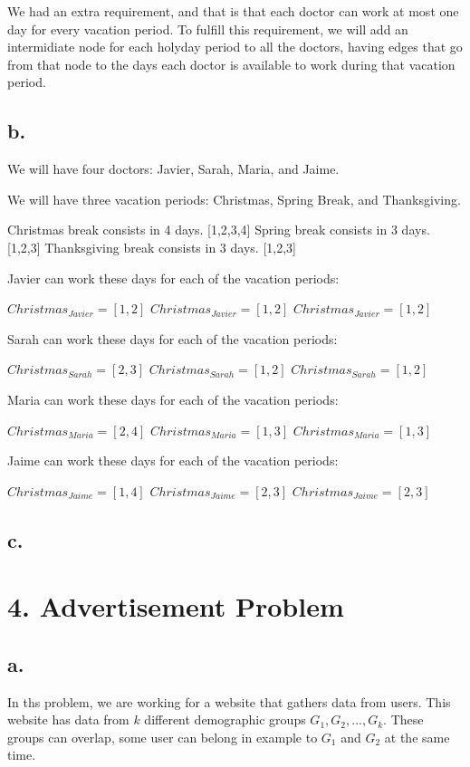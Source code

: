 \documentclass{article}
\begin{document}
We had an extra requirement, and that is that each doctor can work at most one day for every vacation period. To fulfill this requirement, we will add an intermidiate node for each holyday period to all the doctors, having edges that go from that node to the days each doctor is available to work during that vacation period.

\subsection*{b.}

We will have four doctors: Javier, Sarah, Maria, and Jaime.

We will have three vacation periods: Christmas, Spring Break, and Thanksgiving.

Christmas break consists in 4 days. [1,2,3,4]
Spring break consists in 3 days. [1,2,3]
Thanksgiving break consists in 3 days. [1,2,3]

Javier can work these days for each of the vacation periods:

$Christmas_{Javier} = [1,2]$
$Christmas_{Javier} = [1,2]$
$Christmas_{Javier} = [1,2]$

Sarah can work these days for each of the vacation periods:

$Christmas_{Sarah} = [2,3]$
$Christmas_{Sarah} = [1,2]$
$Christmas_{Sarah} = [1,2]$

Maria can work these days for each of the vacation periods:

$Christmas_{Maria} = [2,4]$
$Christmas_{Maria} = [1,3]$
$Christmas_{Maria} = [1,3]$

Jaime can work these days for each of the vacation periods:

$Christmas_{Jaime} = [1,4]$
$Christmas_{Jaime} = [2,3]$
$Christmas_{Jaime} = [2,3]$


\subsection*{c.}

\section*{4. Advertisement Problem}

\subsection*{a.}

In ths problem, we are working for a website that gathers data from users. This website has data from $k$ different  demographic groups $G_1,G_2,...,G_k$. These groups can overlap, some user can belong in example to $G_1$ and $G_2$ at the same time.
\end{document}
